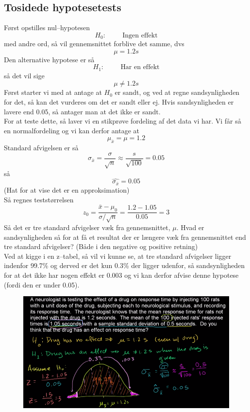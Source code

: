 \documentclass[11pt]{article}
\begin{document}
\subsection{Tosidede hypotesetests}
Først opstilles nul--hypotesen
$$H_0:\hspace{1cm}\text{Ingen effekt}$$
med andre ord, så vil gennemsnittet forblive det samme, dvs
$$\mu=1.2s$$
Den alternative hypotese er så
$$H_1:\hspace{1cm}\text{Har en effekt}$$
så det vil sige 
$$\mu\neq 1.2s$$
Først starter vi med at antage at $H_0$ er sandt, og ved at regne sandsynligheden for det, så kan det vurderes om det er sandt eller ej. Hvis sandsynligheden er lavere end 0.05, så antager man at det ikke er sandt.\\[0.2cm]
For at teste dette, så laver vi en stikprøve fordeling af det data vi har. Vi får så en normalfordeling og vi kan derfor antage at 
$$\mu_{\bar{x}}=\mu=1.2$$
Standard afvigelsen er så
$$\sigma_{\bar{x}}=\frac{\sigma}{\sqrt{n}}\approx\frac{s}{\sqrt{100}}=0.05$$
så 
$$\hat{\sigma_{\bar{x}}}=0.05$$
(Hat for at vise det er en approksimation)\\[0.2cm]
Så regnes teststørrelsen
$$z_0=\frac{\bar{x}-\mu_0}{\sigma/\sqrt{n}}=\frac{1.2-1.05}{0.05}=3$$
Så det er tre standard afvigelser væk fra gennemsnittet, $\mu$. Hvad er sandsynligheden så for at få et resultat der er længere væk fra gennemsnittet end tre standard afvigelser? (Både i den negative og positive retning)\\[0.2cm]
Ved at kigge i en z--tabel, så vil vi kunne se, at tre standard afvigelser ligger indenfor 99.7\% og derved er det kun 0.3\% der ligger udenfor, så sandsynligheden for at det ikke har nogen effekt er 0.003 og vi kan derfor afvise denne hypotese (fordi den er under 0.05).

\begin{figure}[H]
\centering
\includegraphics[scale=0.5]{img/Selection_014}
\end{figure}
\end{document}
